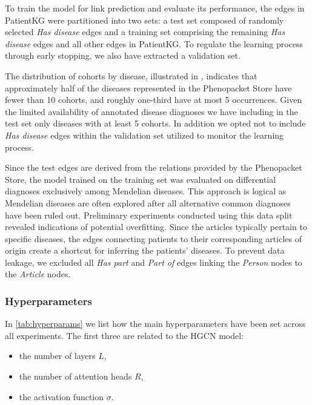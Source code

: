 To train the model for link prediction and evaluate its performance, the edges in PatientKG were partitioned into two sets: a test set composed of randomly selected \emph{Has disease} edges and a training set comprising the remaining \emph{Has disease} edges and all other edges in PatientKG. To regulate the learning process through early stopping, we also have extracted a validation set.

The distribution of cohorts by disease, illustrated in , indicates that approximately half of the diseases represented in the Phenopacket Store have fewer than 10 cohorts, and roughly one-third have at most 5 occurrences. Given the limited availability of annotated disease diagnoses we have including in the test set only diseases with at least 5 cohorts. In addition we opted not to include \emph{Has disease} edges within the validation set utilized to monitor the learning process.

Since the test edges are derived from the relations provided by the Phenopacket Store, the model trained on the training set was evaluated on differential diagnoses exclusively among Mendelian diseases. This approach is logical as Mendelian diseases are often explored after all alternative common diagnoses have been ruled out. Preliminary experiments conducted using this data split revealed indications of potential overfitting. Since the articles typically pertain to specific diseases, the edges connecting patients to their corresponding articles of origin create a shortcut for inferring the patients' diseases. To prevent data leakage, we excluded all \emph{Has part} and \emph{Part of} edges linking the \emph{Person} nodes to the \emph{Article} nodes.

\medskip

\subsubsection{Hyperparameters}


In \cref{tab:hyperparams} we list how the main hyperparameters have been set across all experiments. The first three are related to the HGCN model:
\begin{itemize}
  \item the number of layers $L$,
  \item the number of attention heads $R$,
  \item the activation function $\sigma$.
\end{itemize}

